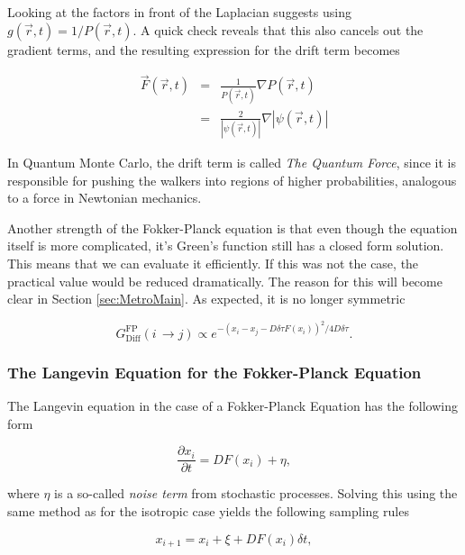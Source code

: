 Looking at the factors in front of the Laplacian suggests using $g(\vec r, t) = 1/P(\vec r, t)$. A quick check reveals that this also cancels out the gradient terms, and the resulting expression for the drift term becomes

\begin{eqnarray}
 \vec F(\vec r, t) &=& \frac{1}{P(\vec r, t)}\nabla P(\vec r, t) \nonumber \\
                   &=& \frac{2}{|\psi(\vec r, t)|}\nabla |\psi(\vec r, t)|
\end{eqnarray}

In Quantum Monte Carlo, the drift term is called \textit{The Quantum Force}, since it is responsible for pushing the walkers into regions of higher probabilities, analogous to a force in Newtonian mechanics.

Another strength of the Fokker-Planck equation is that even though the equation itself is more complicated, it's Green's function still has a closed form solution. This means that we can evaluate it efficiently. If this was not the case, the practical value would be reduced dramatically. The reason for this will become clear in Section \ref{sec:MetroMain}. As expected, it is no longer symmetric 

\begin{equation}
\label{eq:GF_FP}
 G_\mathrm{Diff}^\mathrm{FP}(i\,\rightarrow j) \propto e^{-(x_i-x_j - D\delta\tau F(x_i))^2/4D\delta\tau}.
\end{equation}


\subsubsection{The Langevin Equation for the Fokker-Planck Equation}

The Langevin equation in the case of a Fokker-Planck Equation has the following form

\begin{equation}
 \frac{\partial x_i}{\partial t} = D F(x_i) + \eta,
\end{equation}

where $\eta$ is a so-called \textit{noise term} from stochastic processes. Solving this using the same method as for the isotropic case yields the following sampling rules

\begin{equation}
 \label{eq:langevinSolFP}
 x_{i+1} = x_i + \xi + DF(x_i)\delta t,
\end{equation}


